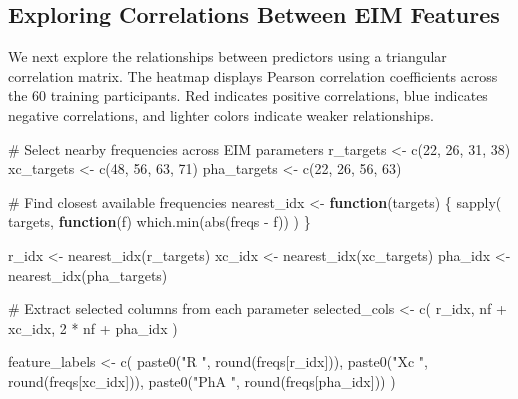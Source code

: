 \documentclass[
  letterpaper,
  DIV=11,
  numbers=noendperiod]{scrreprt}
\newenvironment{Shaded}{\begin{snugshade}}{\end{snugshade}}
\newcommand{\CommentTok}[1]{\textcolor[rgb]{0.37,0.37,0.37}{#1}}
\newcommand{\ControlFlowTok}[1]{\textcolor[rgb]{0.00,0.23,0.31}{\textbf{#1}}}
\newcommand{\DecValTok}[1]{\textcolor[rgb]{0.68,0.00,0.00}{#1}}
\newcommand{\FunctionTok}[1]{\textcolor[rgb]{0.28,0.35,0.67}{#1}}
\newcommand{\NormalTok}[1]{\textcolor[rgb]{0.00,0.23,0.31}{#1}}
\newcommand{\OtherTok}[1]{\textcolor[rgb]{0.00,0.23,0.31}{#1}}
\newcommand{\SpecialCharTok}[1]{\textcolor[rgb]{0.37,0.37,0.37}{#1}}
\newcommand{\StringTok}[1]{\textcolor[rgb]{0.13,0.47,0.30}{#1}}
\begin{document}
\subsection{Exploring Correlations Between EIM
Features}\label{exploring-correlations-between-eim-features}

We next explore the relationships between predictors using a triangular
correlation matrix. The heatmap displays Pearson correlation
coefficients across the 60 training participants. Red indicates positive
correlations, blue indicates negative correlations, and lighter colors
indicate weaker relationships.

\begin{Shaded}
\begin{Highlighting}[]
\CommentTok{\# Select nearby frequencies across EIM parameters}
\NormalTok{r\_targets }\OtherTok{\textless{}{-}} \FunctionTok{c}\NormalTok{(}\DecValTok{22}\NormalTok{, }\DecValTok{26}\NormalTok{, }\DecValTok{31}\NormalTok{, }\DecValTok{38}\NormalTok{)}
\NormalTok{xc\_targets }\OtherTok{\textless{}{-}} \FunctionTok{c}\NormalTok{(}\DecValTok{48}\NormalTok{, }\DecValTok{56}\NormalTok{, }\DecValTok{63}\NormalTok{, }\DecValTok{71}\NormalTok{)}
\NormalTok{pha\_targets }\OtherTok{\textless{}{-}} \FunctionTok{c}\NormalTok{(}\DecValTok{22}\NormalTok{, }\DecValTok{26}\NormalTok{, }\DecValTok{56}\NormalTok{, }\DecValTok{63}\NormalTok{)}

\CommentTok{\# Find closest available frequencies}
\NormalTok{nearest\_idx }\OtherTok{\textless{}{-}} \ControlFlowTok{function}\NormalTok{(targets) \{}
  \FunctionTok{sapply}\NormalTok{(}
\NormalTok{    targets,}
    \ControlFlowTok{function}\NormalTok{(f) }\FunctionTok{which.min}\NormalTok{(}\FunctionTok{abs}\NormalTok{(freqs }\SpecialCharTok{{-}}\NormalTok{ f))}
\NormalTok{  )}
\NormalTok{\}}

\NormalTok{r\_idx }\OtherTok{\textless{}{-}} \FunctionTok{nearest\_idx}\NormalTok{(r\_targets)}
\NormalTok{xc\_idx }\OtherTok{\textless{}{-}} \FunctionTok{nearest\_idx}\NormalTok{(xc\_targets)}
\NormalTok{pha\_idx }\OtherTok{\textless{}{-}} \FunctionTok{nearest\_idx}\NormalTok{(pha\_targets)}

\CommentTok{\# Extract selected columns from each parameter}
\NormalTok{selected\_cols }\OtherTok{\textless{}{-}} \FunctionTok{c}\NormalTok{(}
\NormalTok{  r\_idx,}
\NormalTok{  nf }\SpecialCharTok{+}\NormalTok{ xc\_idx,}
  \DecValTok{2} \SpecialCharTok{*}\NormalTok{ nf }\SpecialCharTok{+}\NormalTok{ pha\_idx}
\NormalTok{)}

\NormalTok{feature\_labels }\OtherTok{\textless{}{-}} \FunctionTok{c}\NormalTok{(}
  \FunctionTok{paste0}\NormalTok{(}\StringTok{"R "}\NormalTok{, }\FunctionTok{round}\NormalTok{(freqs[r\_idx])),}
  \FunctionTok{paste0}\NormalTok{(}\StringTok{"Xc "}\NormalTok{, }\FunctionTok{round}\NormalTok{(freqs[xc\_idx])),}
  \FunctionTok{paste0}\NormalTok{(}\StringTok{"PhA "}\NormalTok{, }\FunctionTok{round}\NormalTok{(freqs[pha\_idx]))}
\NormalTok{)}


\end{Highlighting}
\end{Shaded}
\end{document}
